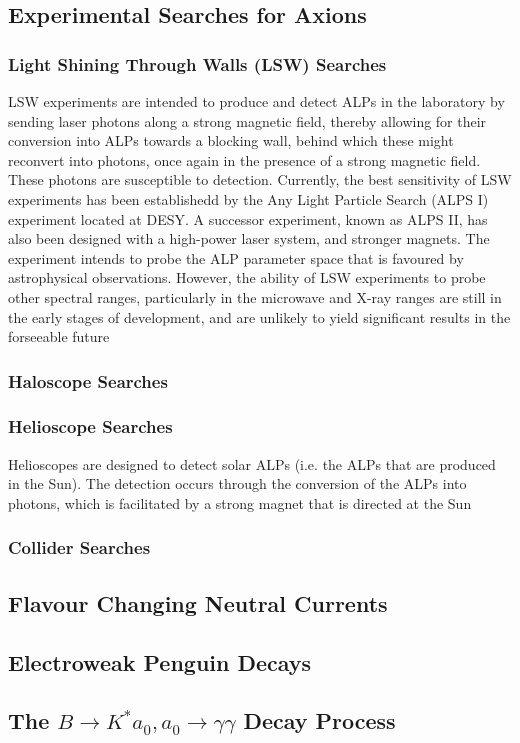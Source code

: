 \subsection{Experimental Searches for Axions}
\subsubsection{Light Shining Through Walls (LSW) Searches}
LSW experiments are intended to produce and detect ALPs in the laboratory by sending laser photons along a strong magnetic field,
thereby allowing for their conversion into ALPs towards a blocking wall, behind which these might reconvert into photons, once again in the presence of 
a strong magnetic field. These photons are susceptible to detection. Currently, the best sensitivity of LSW experiments has been establishedd by the Any Light Particle Search
(ALPS I) experiment located at DESY. A successor experiment, known as ALPS II, has also been designed with a high-power laser system, and stronger magnets. The experiment intends to 
probe the ALP parameter space that is favoured by astrophysical observations. However, the ability of LSW experiments to probe other spectral ranges, particularly in the microwave and
X-ray ranges are still in the early stages of development, and are unlikely to yield significant results in the forseeable future
\subsubsection{Haloscope Searches}
\subsubsection{Helioscope Searches}
Helioscopes are designed to detect solar ALPs (i.e. the ALPs that are produced in the Sun). The detection occurs through the conversion of the ALPs into photons, which is facilitated by a strong magnet that is directed at the Sun
\subsubsection{Collider Searches}                                                                                     
\subsection{Flavour Changing Neutral Currents} 

\subsection{Electroweak Penguin Decays}
\subsection{The $B\rightarrow K^{*}a_{0}, a_{0}\rightarrow\gamma\gamma$ Decay Process}


